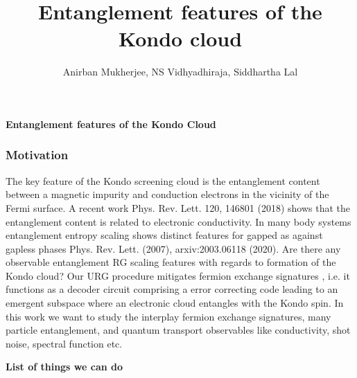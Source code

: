 \documentclass[11pt,a4paper]{article}
\author{Anirban Mukherjee, NS Vidhyadhiraja, Siddhartha Lal}
\title{Entanglement features of the Kondo cloud}
\begin{document}
\begin{center}\begin{Large}\textbf{Entanglement features of the Kondo Cloud}\end{Large}\end{center}
\subsubsection*{Motivation}
The key feature of the Kondo screening cloud is the entanglement content between a magnetic impurity and conduction electrons in the vicinity of the Fermi surface. A recent work Phys. Rev. Lett. 120, 146801 (2018) shows that the entanglement content is related to electronic conductivity. In many body systems entanglement entropy scaling shows distinct features for gapped as against gapless phases Phys. Rev. Lett. (2007), arxiv:2003.06118 (2020).  Are there any observable entanglement RG scaling features with regards to formation of the Kondo cloud? Our  URG procedure mitigates fermion exchange signatures , i.e. it functions as a decoder circuit comprising a error correcting code leading to an emergent subspace where an electronic cloud entangles with the Kondo spin. In this work we want to study the interplay fermion exchange signatures, many particle entanglement, and quantum transport observables like conductivity, shot noise, spectral function etc.\\
\par\noindent
\textbf{List of things we can do}
\par\noindent
\end{document}
